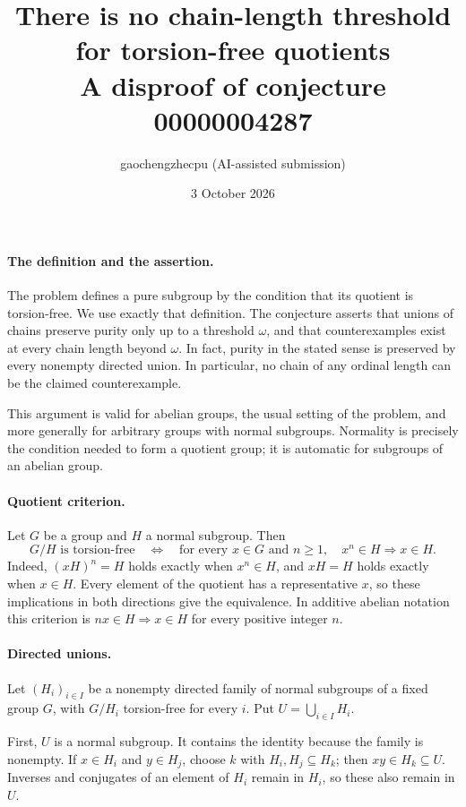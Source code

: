 \documentclass[10pt]{article}
\title{There is no chain-length threshold for torsion-free quotients\\A disproof of conjecture 00000004287}
\author{gaochengzhecpu (AI-assisted submission)}
\date{3 October 2026}
\begin{document}
\maketitle

\paragraph{The definition and the assertion.}
The problem defines a pure subgroup by the condition that its quotient is torsion-free. We use exactly that definition. The conjecture asserts that unions of chains preserve purity only up to a threshold $\omega$, and that counterexamples exist at every chain length beyond $\omega$. In fact, purity in the stated sense is preserved by every nonempty directed union. In particular, no chain of any ordinal length can be the claimed counterexample.

This argument is valid for abelian groups, the usual setting of the problem, and more generally for arbitrary groups with normal subgroups. Normality is precisely the condition needed to form a quotient group; it is automatic for subgroups of an abelian group.

\paragraph{Quotient criterion.}
Let $G$ be a group and $H$ a normal subgroup. Then
\[
 G/H\text{ is torsion-free}\quad\Longleftrightarrow\quad
 \text{for every }x\in G\text{ and }n\ge1,\quad x^n\in H\Longrightarrow x\in H.
\]
Indeed, $(xH)^n=H$ holds exactly when $x^n\in H$, and $xH=H$ holds exactly when $x\in H$. Every element of the quotient has a representative $x$, so these implications in both directions give the equivalence. In additive abelian notation this criterion is $nx\in H\Rightarrow x\in H$ for every positive integer $n$.

\paragraph{Directed unions.}
Let $(H_i)_{i\in I}$ be a nonempty directed family of normal subgroups of a fixed group $G$, with $G/H_i$ torsion-free for every $i$. Put $U=\bigcup_{i\in I}H_i$.

First, $U$ is a normal subgroup. It contains the identity because the family is nonempty. If $x\in H_i$ and $y\in H_j$, choose $k$ with $H_i,H_j\subseteq H_k$; then $xy\in H_k\subseteq U$. Inverses and conjugates of an element of $H_i$ remain in $H_i$, so these also remain in $U$.
\end{document}
